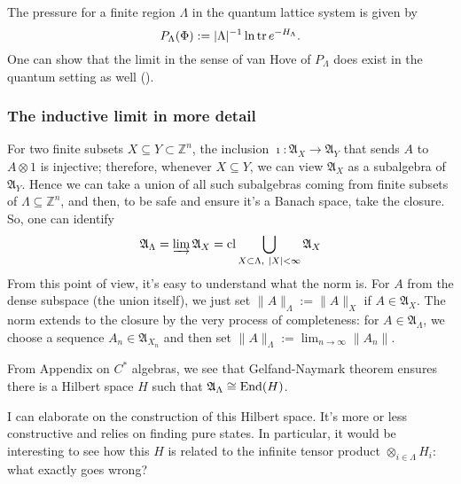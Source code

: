 The pressure for a finite region $\Lambda$ in the quantum lattice system is given by
\[
P_{\Lambda}(\Phi) := |\Lambda|^{-1} \ln \operatorname{tr} e^{-H_{\Lambda}}.
\]
One can show that the limit in the sense of van Hove of $P_{\Lambda}$ does exist in the quantum setting as well (\cite{israel}).

%
\subsubsection{The inductive limit in more detail}
For two finite subsets $X \subseteq Y \subset \mathbb Z^n$, the inclusion $\imath : \mathfrak A_{X} \rightarrow \mathfrak A_{Y}$ that sends $A$ to $A \otimes 1$ is injective; therefore, whenever $X \subseteq Y$, we can view $\mathfrak A_{X}$ as a subalgebra of $\mathfrak A_{Y}$. Hence we can take a union of all such subalgebras coming from finite subsets of $\Lambda \subseteq \mathbb Z^n$, and then, to be safe and ensure it's a Banach space, take the closure. So, one can identify
\[
\mathfrak A_{\Lambda} = \varinjlim \mathfrak A_{X} = \operatorname{cl} \bigcup_{X \subset \Lambda, \ |X| < \infty} \mathfrak A_{X}
\]
From this point of view, it's easy to understand what the norm is. For $A$ from the dense subspace (the union itself), we just set $\|A\|_{\Lambda} := \|A\|_{X}$ if $A \in \mathfrak A_{X}$. The norm extends to the closure by the very process of completeness: for $A \in \mathfrak A_{\Lambda}$, we choose a sequence $A_n \in \mathfrak A_{X_n}$ and then set $\|A\|_{\Lambda} := \lim_{n \rightarrow \infty} \|A_n\|$.

From Appendix on $C^*$ algebras, we see that Gelfand-Naymark theorem ensures there is a Hilbert space $H$ such that $\mathfrak A_{\Lambda} \cong \operatorname{End}(H)$.
\begin{fur}
I can elaborate on the construction of this Hilbert space. It's more or less constructive and relies on finding pure states. In particular, it would be interesting to see how this $H$ is related to the infinite tensor product $\otimes_{i \in \Lambda} H_i$: what exactly goes wrong?
\end{fur}


